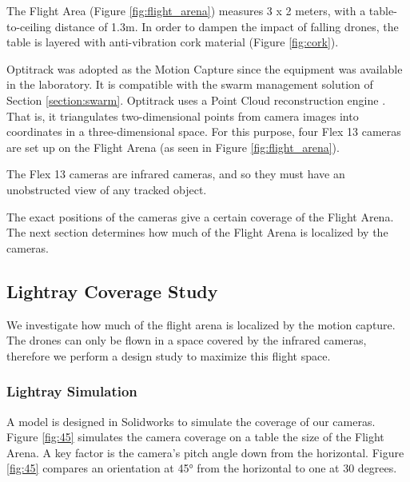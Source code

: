 The Flight Area (Figure \ref{fig:flight_arena}) measures 3 x 2 meters, with a table-to-ceiling distance of 1.3m. In order to dampen the impact of falling drones, the table is layered with anti-vibration cork material (Figure \ref{fig:cork}). 

Optitrack \cite{optitrack} was adopted as the Motion Capture since the equipment was available in the laboratory. It is compatible with the swarm management solution of Section \ref{section:swarm}. Optitrack uses a Point Cloud reconstruction engine \cite{optitrack_docs}. That is, it triangulates two-dimensional points from camera images into coordinates in a three-dimensional space. For this purpose, four Flex 13 cameras are set up on the Flight Arena (as seen in Figure \ref{fig:flight_arena}).

The Flex 13 cameras \cite{optitrack_docs} are infrared cameras, and so they must have an unobstructed view of any tracked object. 

The exact positions of the cameras give a certain coverage of the Flight Arena. The next section determines how much of the Flight Arena is localized by the cameras.

\pagebreak
\subsection{Lightray Coverage Study}



We investigate how much of the flight arena is localized by the motion capture. The drones can only be flown in a space covered by the infrared cameras, therefore we perform a design study to maximize this flight space.


\subsubsection{Lightray Simulation}

A model is designed in Solidworks \cite{solidworks} to simulate the coverage of our cameras. Figure \ref{fig:45} simulates the camera coverage on a table the size of the Flight Arena.  
A key factor is the camera's pitch angle down from the horizontal. Figure \ref{fig:45} compares an orientation at 45° from the horizontal to one at 30 degrees.

